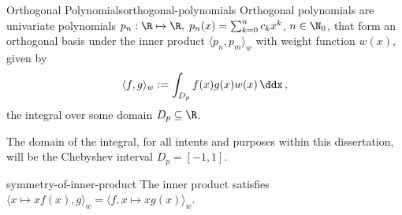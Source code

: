 \begin{definition}{Orthogonal Polynomials}{orthogonal-polynomials}
  Orthogonal polynomials are univariate polynomials
  $p_n: \R \mapsto \R, \; p_n(x) = \sum_{k=0}^{n} c_k x^k$, $n \in \N_0$,
  that form an orthogonal basis under the inner product $\langle p_n, p_m \rangle_w$ with weight function $w(x)$, given by
  $$\langle f, g \rangle_w := \int_{D_p} f(x) g(x) w(x) \,\ddx\,,$$
  the integral over some domain $D_p \subseteq \R$.
\end{definition}

The domain of the integral, for all intents and purposes within this dissertation, will be the Chebyshev interval $D_p = [-1, 1]$.

\begin{remark}{}{symmetry-of-inner-product}
  The inner product satisfies $\langle x\mapsto xf(x), g \rangle_w = \langle f, x \mapsto xg(x)\rangle_w$.
\end{remark}

